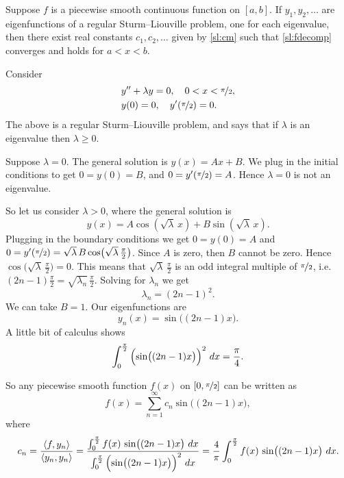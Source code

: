 \begin{theorem}
Suppose $f$ is a piecewise smooth continuous function on $[a,b]$.  If $y_1,
y_2, \ldots$ are eigenfunctions of a regular Sturm--Liouville problem,
one for each eigenvalue,
then there exist real constants $c_1, c_2, \ldots$ given by \eqref{sl:cm}
such that
\eqref{sl:fdecomp} converges and holds for $a < x < b$.
\end{theorem}

\begin{example}
Consider
\begin{align*}
& y'' + \lambda y = 0, \quad 0 < x < \nicefrac{\pi}{2} , \\
& y(0) =0, \quad y'(\nicefrac{\pi}{2}) = 0 .
\end{align*}
The above is a regular Sturm--Liouville problem, and
says that if $\lambda$ is an eigenvalue then
$\lambda \geq 0$.

Suppose $\lambda = 0$.  The general solution is $y(x) = Ax + B$.
We plug in the
initial conditions to get $0=y(0) = B$, and $0 = y'(\nicefrac{\pi}{2}) = A$.
Hence $\lambda = 0$ is not an eigenvalue.

So let us consider $\lambda > 0$, where
the general solution is
\begin{equation*}
y(x) = A \cos ( \sqrt{\lambda} \, x ) + B \sin ( \sqrt{\lambda} \, x) .
\end{equation*}
Plugging in the boundary conditions we get
$0 = y(0) = A$ and $0 = y'(\nicefrac{\pi}{2})
= \sqrt{\lambda} \, B \cos \bigl(\sqrt{\lambda} \, \frac{\pi}{2}\bigr)$.
Since $A$ is zero, then
$B$ cannot be zero.  Hence $\cos \bigl( \sqrt{\lambda} \,
\frac{\pi}{2}\bigr) = 0$.
This means that
$\sqrt{\lambda} \,\frac{\pi}{2}$ is an odd integral multiple of
$\nicefrac{\pi}{2}$,
i.e.\ $(2n-1)\frac{\pi}{2} = \sqrt{\lambda_n} \,\frac{\pi}{2}$.
Solving for $\lambda_n$ we get
\begin{equation*}
\lambda_n = {(2n-1)}^2 .
\end{equation*}
We can take $B = 1$.  Our eigenfunctions are
\begin{equation*}
y_n(x) = \sin \bigl( (2n-1)x \bigr) .
\end{equation*}
A little bit of calculus shows
\begin{equation*}
\int_0^{\frac{\pi}{2}} {\Bigl( \sin \bigl( (2n-1)x \bigr) \Bigr)}^2 ~ dx
= \frac{\pi}{4} .
\end{equation*}

So any piecewise smooth function $f(x)$ on $[0,\nicefrac{\pi}{2}]$ can be written as
\begin{equation*}
f(x) = \sum_{n=1}^\infty c_n \sin \bigl( (2n-1)x \bigr) ,
\end{equation*}
where
\begin{equation*}
c_n = \frac{\langle f , y_n \rangle}{\langle y_n , y_n \rangle}
= \frac{\int_0^{\frac{\pi}{2}} f(x) \, \sin \bigl( (2n-1)x \bigr) ~ dx
}{\int_0^{\frac{\pi}{2}} {\Bigl(\sin \bigl((2n-1)x\bigr)\Bigr)}^2 ~ dx}
= \frac{4}{\pi} \int_0^{\frac{\pi}{2}} f(x) \,\sin \bigl( (2n-1)x \bigr) ~ dx .
\end{equation*}


\end{example}
